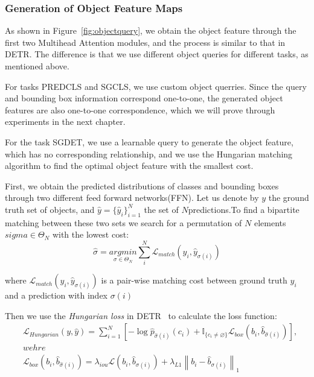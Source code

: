 \subsubsection{Generation of Object Feature Maps }

As shown in Figure~\ref{fig:objectquery}, we obtain the object feature through the first two Multihead Attention modules, and the process is similar to that in DETR. The difference is that we use different object queries for different tasks, as mentioned above.

For tasks PREDCLS and SGCLS, we use custom object querries. Since the query and bounding box information correspond one-to-one, the generated object features are also one-to-one correspondence, which we will prove through experiments in the next chapter.

For the task SGDET, we use a learnable query to generate the object feature, which has no corresponding relationship, and we use the Hungarian matching algorithm to find the optimal object feature with the smallest cost.

First, we obtain the predicted distributions of classes and bounding boxes through two different feed forward networks(FFN). Let us denote by $ y $ the ground truth set of objects, and $  \hat{y}= \{ \hat{y}_i\} ^N_{i=1} $ the set of $ N  $predictions.To find a bipartite matching between these two sets we search for a permutation of $ N $ elements $sigma \in \Theta _N $ with the lowest cost:
\begin{equation}\label{equ:matcher}
 \hat{\sigma} = \underset{\sigma \in \Theta _N }{argmin} \sum_{i}^{N} \mathcal L_{match} (y_i,\hat{y}_{\sigma(i)})
\end{equation}

where $\mathcal L_{match} (y_i,\hat{y}_{\sigma(i)})$ is a pair-wise matching cost between ground truth $ y_i $ and a prediction with index $ \sigma(i) $

Then we use the \textit{Hungarian loss }in DETR~\cite{carion2020end} to calculate the loss function:
\begin{equation}\label{equ:hungarianloss}
	\begin{aligned}
	&\mathcal L_{Hungarian}(y,\hat{y} ) = \sum^{N}_{i=1}[-\log{\hat{p}_{\hat{\sigma}(i)}(c_i)} + \mathbb{I}_{\{c_i \ne  \varnothing \}}\mathcal{L}_{box}(b_i,\hat{b}_{\hat{\sigma}(i)})   ], \\
	&wehre \\
	&\mathcal{L}_{box}(b_i,\hat{b}_{\hat{\sigma}(i)}) = \lambda_{iou}\mathcal{L}(b_i,\hat{b}_{\sigma(i)}) + \lambda_{L1}\left \| b_i - \hat{b}_{\sigma (i)}  \right \| _1
	\end{aligned}
\end{equation}

